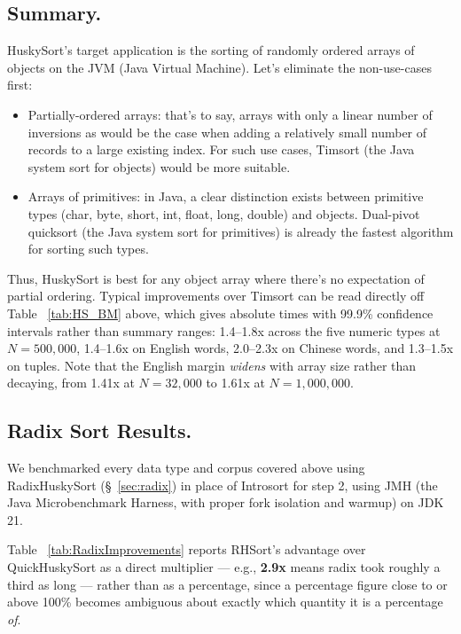 \documentclass[twoside,leqno,twocolumn]{article}
\begin{document}
\subsection{Summary.}
\label{sec:summary}
HuskySort’s target application is the sorting of randomly ordered arrays of objects on the JVM (Java Virtual Machine).
Let’s eliminate the non-use-cases first:
\begin{itemize}
\item {}Partially-ordered arrays:
that’s to say, arrays with only a linear number of inversions as would be the case when adding a relatively small number of records to a large existing index.
For such use cases, Timsort (the Java system sort for objects) would be more suitable.

\item {}Arrays of primitives:
in Java, a clear distinction exists between primitive types (char, byte, short, int, float, long, double) and objects.
Dual-pivot quicksort (the Java system sort for primitives) is already the fastest algorithm for sorting such types.
\end{itemize}
Thus, HuskySort is best for any object array where there’s no expectation of partial ordering.
Typical improvements over Timsort can be read directly off Table ~\ref{tab:HS_BM} above, which gives
absolute times with 99.9\% confidence intervals rather than summary ranges:
1.4--1.8x across the five numeric types at $N=500{,}000$,
1.4--1.6x on English words,
2.0--2.3x on Chinese words,
and 1.3--1.5x on tuples.
Note that the English margin \emph{widens} with array size rather than decaying,
from 1.41x at $N=32{,}000$ to 1.61x at $N=1{,}000{,}000$.

\subsection{Radix Sort Results.}
\label{sec:radix-results}

We benchmarked every data type and corpus covered above using RadixHuskySort (\S~\ref{sec:radix})
in place of Introsort for step 2, using JMH (the Java Microbenchmark Harness, with proper fork isolation and warmup) on JDK 21.

Table ~\ref{tab:RadixImprovements} reports RHSort's advantage over QuickHuskySort as a direct multiplier —
e.g., \textbf{2.9x} means radix took roughly a third as long —
rather than as a percentage, since a percentage figure close to or above 100\% becomes ambiguous about exactly which quantity it is a percentage \emph{of}.
\end{document}
